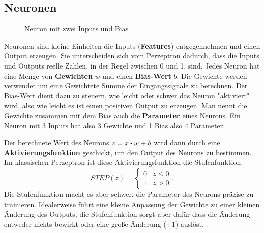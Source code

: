 \subsection{Neuronen}

\begin{figure}[!hbt]
	\centering
	\caption{Neuron mit zwei Inputs und Bias}
\end{figure}

Neuronen sind kleine Einheiten die Inputs (\textbf{Features}) entgegennehmen und einen Output erzeugen. Sie unterscheiden sich vom Perzeptron dadurch, dass die Inputs und Outputs reelle Zahlen, in der Regel zwischen 0 und 1, sind. Jedes Neuron hat eine Menge von \textbf{Gewichten} $w$ und einen \textbf{Bias-Wert} $b$. Die Gewichte werden verwendet um eine Gewichtete Summe der Eingangssignale zu berechnen. Der Bias-Wert dient dazu zu steuern, wie leicht oder schwer das Neuron "aktiviert" wird, also wie leicht es ist einen positiven Output zu erzeugen. Man nennt die Gewichte zusammen mit dem Bias auch die \textbf{Parameter} eines Neurons. Ein Neuron mit 3 Inputs hat also 3 Gewichte und 1 Bias also 4 Parameter.


Der berechnete Wert des Neurons $z = x \bigcdot w + b$ wird dann durch eine \textbf{Aktivierungsfunktion} geschickt, um den Output des Neurons zu bestimmen. Im klassischen Perzeptron ist diese Aktivierungsfunktion die Stufenfunktion
\begin{equation}
	STEP(z) = \begin{cases}
	0 & z \le 0\\
	1 & z > 0
	\end{cases}.
\end{equation}
Die Stufenfunktion macht es aber schwer, die Parameter des Neurons präzise zu trainieren. Idealerweise führt eine kleine Anpassung der Gewichte zu einer kleinen Änderung des Outputs, die Stufenfunktion sorgt aber dafür dass die Änderung entweder nichts bewirkt oder eine große Änderung ($\pm 1$) auslöst.

